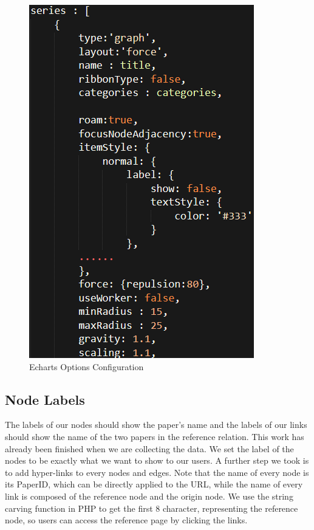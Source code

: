 \documentclass{book}
\begin{document}
\begin{figure}[H]
\centering
\includegraphics[scale=0.55]{img/zlt_rel_code_config.png}
\caption{Echarts Options Configuration}
\end{figure}

\subsection{Node Labels}

The labels of our nodes should show the paper's name and the labels of our links should show the name of the two papers in the reference relation. This work has already been finished when we are collecting the data. We set the label of the nodes to be exactly what we want to show to our users. A further step we took is to add hyper-links to every nodes and edges. Note that the name of every node is its PaperID, which can be directly applied to the URL, while the name of every link is composed of the reference node and the origin node. We use the string carving function in PHP to get the first 8 character, representing the reference node, so users can access the reference page by clicking the links.
\end{document}
